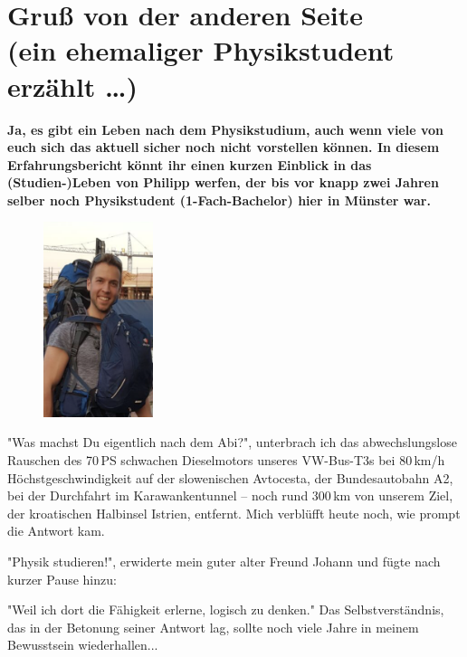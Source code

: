 \section[Gruß von der anderen Seite (ein ehemaliger Physikstudent erzählt \dots)]{Gruß von der anderen Seite\\(ein ehemaliger Physikstudent erzählt \dots)}
\textbf{
Ja, es gibt ein Leben nach dem Physikstudium, auch wenn viele von euch sich das aktuell sicher noch nicht vorstellen können.
In diesem Erfahrungsbericht könnt ihr einen kurzen Einblick in das (Studien-)Leben von Philipp werfen, der bis vor knapp zwei Jahren selber noch Physikstudent (1-Fach-Bachelor) hier in Münster war.
}


\begin{multicols}{2}

\begin{multicols}{2}
\begin{figure}
	\includegraphics[width=3.2cm]{res/philipp_van_wickevoort_crommelin.PNG}
\end{figure}
\end{multicols}

"Was machst Du eigentlich nach dem Abi?", unterbrach ich das abwechslungslose Rauschen des 70\,PS schwachen Dieselmotors unseres
VW-Bus-T3s bei 80\,km/h Höchstgeschwindigkeit auf der slowenischen Avtocesta, der Bundesautobahn A2, bei der Durchfahrt im
Karawankentunnel – noch rund 300\,km von unserem Ziel, der kroatischen Halbinsel Istrien, entfernt.
Mich verblüfft heute noch, wie prompt die Antwort kam.

"Physik studieren!", erwiderte mein guter alter Freund Johann und fügte nach kurzer Pause hinzu:

"Weil ich dort die Fähigkeit erlerne, logisch zu denken."
Das Selbstverständnis, das in der Betonung seiner Antwort lag, sollte noch viele Jahre in meinem Bewusstsein wiederhallen... \\ 


\end{multicols}

